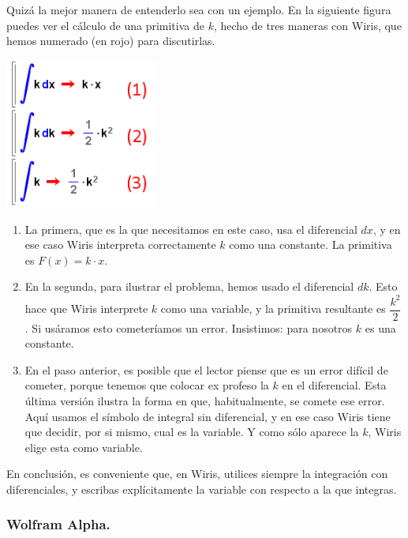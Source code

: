 \documentclass[10pt,a4paper]{article}\usepackage[]{graphicx}\usepackage[]{color}
\begin{document}
Quizá la mejor manera de entenderlo sea con un ejemplo. En la siguiente figura puedes ver el cálculo de una primitiva de $k$, hecho de tres maneras con Wiris, que hemos numerado (en rojo) para discutirlas.
\begin{center}
    \includegraphics[width=5cm]{../fig/Tut05-18.png}
\end{center}
\begin{enumerate}
  \item La primera, que es la que necesitamos en este caso, usa el diferencial $dx$, y en ese caso Wiris interpreta correctamente $k$ como una constante. La primitiva es $F(x)=k\cdot x$.
  \item En la segunda, para ilustrar el problema, hemos usado el diferencial $dk$. Esto hace que Wiris interprete $k$ como una variable, y la primitiva resultante es $\dfrac{k^2}{2}$. Si usáramos esto cometeríamos un error. Insistimos: para nosotros $k$ es una constante.
  \item En el paso anterior, es posible que el lector piense que es un error difícil de cometer, porque tenemos que colocar ex profeso la $k$ en el diferencial. Esta última versión ilustra la forma en que, habitualmente, se comete ese error. Aquí usamos el símbolo de integral sin diferencial, y en ese caso Wiris tiene que decidir, por si mismo, cual es la variable. Y como sólo aparece la $k$, Wiris elige esta como variable.
\end{enumerate}
En conclusión, es conveniente que, en Wiris, utilices siempre la integración con diferenciales, y escribas explícitamente la variable con respecto a la que integras.

\subsubsection*{Wolfram Alpha.}
\end{document}
